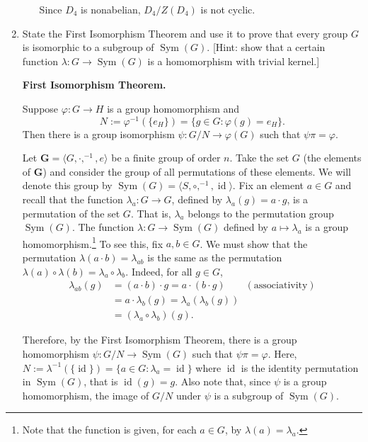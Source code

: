 \documentclass[fleqn,12pt]{article}
\newcommand{\<}{\ensuremath{\langle}}
\renewcommand{\>}{\ensuremath{\rangle}}
\newcommand{\Sym}{\ensuremath{\operatorname{Sym}}}
\newcommand{\id}{\ensuremath{\operatorname{id}}}
\newcommand{\bG}{\ensuremath{\mathbf{G}}}
\begin{document}
\begin{enumerate}[{\bf 1.}]
\begin{enumerate}
\medskip

Since $D_4$ is nonabelian, $D_4/Z(D_4)$ is not cyclic.
\end{enumerate}
\newpage
\item State the First Isomorphism Theorem and use it to prove that every group
  $G$ is isomorphic to a subgroup of $\Sym(G)$. [Hint: show that a certain
  function $\lambda : G \rightarrow \Sym(G)$ is a homomorphism with trivial
  kernel.]

\medskip

  {\bf First Isomorphism Theorem.}

  Suppose $\varphi: G \rightarrow H$ is a group homomorphism
  and 
  \[
  N := \varphi^{-1}(\{e_H\}) = \{g\in G: \varphi(g) = e_H\}.
  \]
  Then there is a group isomorphism $\psi : G/N \rightarrow \varphi(G)$ such
  that $\psi \pi = \varphi$. 


Let $\bG = \<G, \cdot, ^{-1}, e\>$ be a finite group of order $n$.  
Take the set $G$ (the elements of $\bG$) and consider the group of all
permutations of these elements.  We will denote this group by
$\Sym(G) = \<S, \circ, ^{-1}, \id\>$.
Fix an element $a\in G$ and recall that the function
$\lambda_a: G \rightarrow G$, defined by $\lambda_a(g) = a\cdot g$, is a
permutation of the set $G$.  That is, $\lambda_a$ belongs to the
permutation group $\Sym(G)$.  
The function $\lambda: G \rightarrow \Sym(G)$ defined by 
$a\mapsto \lambda_a$ is a group homomorphism.\footnote{Note that the function
is given, for each $a\in G$, by $\lambda(a) = \lambda_a$.}
To see this, fix $a, b \in G$.  We must show that
the permutation 
$\lambda(a\cdot b) = \lambda_{ab}$
is the same as the permutation 
$\lambda(a) \circ \lambda(b) = \lambda_a \circ \lambda_b$.
Indeed, for all $g \in G$,
\begin{align*}
\lambda_{ab} (g) &= (a\cdot b) \cdot g = a \cdot (b \cdot g) \qquad (\text{associativity})\\
&= a \cdot \lambda_b(g) = \lambda_a (\lambda_b(g)) \\
& = (\lambda_a \circ \lambda_b)(g).
\end{align*}

Therefore, by the First Isomorphism Theorem, there is a group homomorphism 
$\psi : G/N \rightarrow \Sym(G)$ such that $\psi \pi = \varphi$. Here,
$N := \lambda^{-1}(\{\id\}) = \{a\in G: \lambda_a = \id\}$ where
$\id$ is the identity permutation in $\Sym(G)$, that is $\id(g) =g$.  Also note
that, since $\psi$ is a group homomorphism, the image of $G/N$ under $\psi$ is a
subgroup of $\Sym(G)$.


\end{enumerate}
\end{document}
